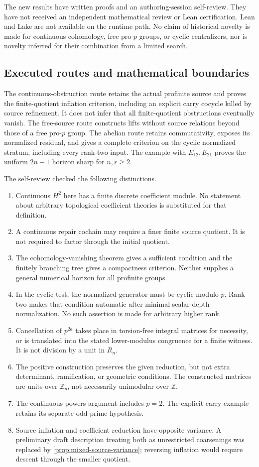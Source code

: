 \documentclass[11pt]{article}
\theoremstyle{definition}
\theoremstyle{remark}
\begin{document}
The new results have written proofs and an authoring-session self-review. They have not received an independent mathematical review or Lean certification. Lean and Lake are not available on the runtime path. No claim of historical novelty is made for continuous cohomology, free pro-$p$ groups, or cyclic centralizers, nor is novelty inferred for their combination from a limited search.

\subsection{Executed routes and mathematical boundaries}
The continuous-obstruction route retains the actual profinite source and proves the finite-quotient inflation criterion, including an explicit carry cocycle killed by source refinement. It does not infer that all finite-quotient obstructions eventually vanish. The free-source route constructs lifts without source relations beyond those of a free pro-$p$ group. The abelian route retains commutativity, exposes its normalized residual, and gives a complete criterion on the cyclic normalized stratum, including every rank-two input. The example with $E_{12},E_{21}$ proves the uniform $2n-1$ horizon sharp for $n,r\geq2$.

The self-review checked the following distinctions.
\begin{enumerate}
\item Continuous $H^2$ here has a finite discrete coefficient module. No statement about arbitrary topological coefficient theories is substituted for that definition.
\item A continuous repair cochain may require a finer finite source quotient. It is not required to factor through the initial quotient.
\item The cohomology-vanishing theorem gives a sufficient condition and the finitely branching tree gives a compactness criterion. Neither supplies a general numerical horizon for all profinite groups.
\item In the cyclic test, the normalized generator must be cyclic modulo $p$. Rank two makes that condition automatic after minimal scalar-depth normalization. No such assertion is made for arbitrary higher rank.
\item Cancellation of $p^{2a}$ takes place in torsion-free integral matrices for necessity, or is translated into the stated lower-modulus congruence for a finite witness. It is not division by a unit in $R_n$.
\item The positive construction preserves the given reduction, but not extra determinant, ramification, or geometric conditions. The constructed matrices are units over $\mathbb Z_p$, not necessarily unimodular over $\mathbb Z$.
\item The continuous-powers argument includes $p=2$. The explicit carry example retains its separate odd-prime hypothesis.
\item Source inflation and coefficient reduction have opposite variance. A preliminary draft description treating both as unrestricted coarsenings was replaced by \cref{prop:mixed-source-variance}; reversing inflation would require descent through the smaller quotient.
\end{enumerate}
\end{document}
